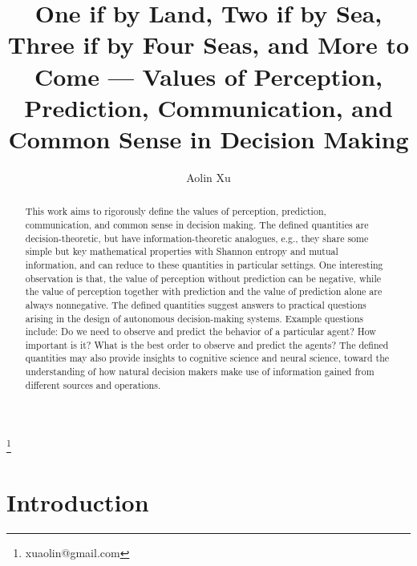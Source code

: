 \documentclass{article}
\title{
One if by Land, Two if by Sea, Three if by Four Seas, and More to Come --- Values of Perception, Prediction, Communication, and Common Sense  in Decision Making}
\author{Aolin Xu} %
\date{}
\newcommand\blfootnote[1]{%
	\begingroup
	\renewcommand\thefootnote{}\footnote{#1}%
	\addtocounter{footnote}{-1}%
	\endgroup
}
\begin{document}
	
	\maketitle
	\blfootnote{xuaolin@gmail.com}

\begin{abstract}
This work aims to rigorously define the values of perception, prediction, communication, and common sense in decision making.
  The defined quantities are decision-theoretic, but have information-theoretic analogues, e.g., they share some simple but key mathematical properties with Shannon entropy and mutual information, and can reduce to these quantities in particular settings.
 One interesting observation is that, the value of perception without prediction can be negative, while the value of perception together with prediction and the value of prediction alone are always nonnegative.
 The defined quantities suggest answers to practical questions arising in the design of autonomous decision-making systems. Example questions include: Do we need to observe and predict the behavior of a particular agent? How important is it? What is the best order to observe and predict the agents?
 The defined quantities may also provide insights to cognitive science and neural science, toward the understanding of how natural decision makers make use of information gained from different sources and operations.
\end{abstract}
\section{Introduction}

\end{document}
